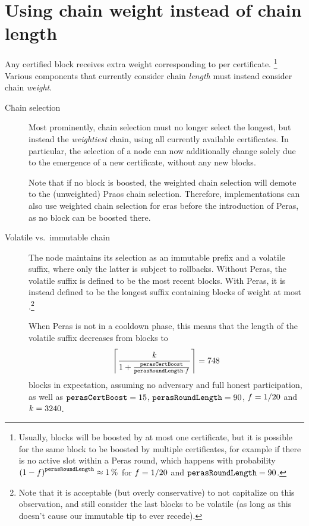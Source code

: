 \section{Using chain weight instead of chain length}\label{sec:weight not length}

Any certified block receives extra weight corresponding to \perasBoost{} per certificate.%
\footnote{Usually, blocks will be boosted by at most one certificate, but it is possible for the same block to be boosted by multiple certificates, for example if there is no active slot within a Peras round, which happens with probability ${(1-f)}^{\mathtt{perasRoundLength}} \approx \qty{1}{\percent}$ for $f=1/20$ and $\mathtt{perasRoundLength}=90$.}
Various components that currently consider chain \emph{length} must instead consider chain \emph{weight}.

\begin{description}
\item[Chain selection]
  Most prominently, chain selection must no longer select the longest, but instead the \emph{weightiest} chain, using all currently available certificates.
  In particular, the selection of a node can now additionally change solely due to the emergence of a new certificate, without any new blocks.

  Note that if no block is boosted, the weighted chain selection will demote to the (unweighted) Praos chain selection.
  Therefore, implementations can also use weighted chain selection for eras before the introduction of Peras, as no block can be boosted there.
\item[Volatile vs.\ immutable chain]
  The node maintains its selection as an immutable prefix and a volatile suffix, where only the latter is subject to rollbacks.
  Without Peras, the volatile suffix is defined to be the \kcp{} most recent blocks.
  With Peras, it is instead defined to be the longest suffix containing blocks of weight at most \kcp{}.\footnote{
    Note that it is acceptable (but overly conservative) to not capitalize on this observation, and still consider the last \kcp{} blocks to be volatile (as long as this doesn't cause our immutable tip to ever recede).}

  When Peras is not in a cooldown phase, this means that the length of the volatile suffix decreases from \kcp{} blocks to
  \[ \left\lceil \frac{k }{1 + \frac{\mathtt{perasCertBoost}}{\mathtt{perasRoundLength} \cdot f}} \right\rceil = 748 \]
  blocks in expectation, assuming no adversary and full honest participation, as well as $\mathtt{perasCertBoost} = 15$, $\mathtt{perasRoundLength} = 90$, $f = 1/20$ and $k = 3240$.


\end{description}
